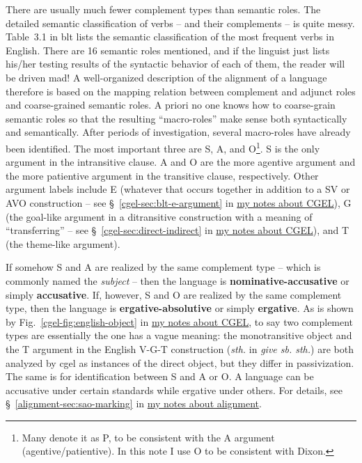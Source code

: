 \documentclass[UTF8, a4paper, oneside, scheme=plain]{ctexart}
\newcommand*{\citesec}[1]{\S~{#1}}
\newcommand*{\citefig}[1]{Fig.~{#1}}
\newcommand*{\citetable}[1]{Table~{#1}}
\newcommand*{\concept}[1]{\textbf{#1}}
\newcommand*{\term}[1]{\emph{#1}}
\newcommand*{\corpus}[1]{\emph{#1}}
\newcommand{\cgel}{\href{../English/cambridge.pdf}{my notes about CGEL}}
\newcommand{\alignment}{\href{../alignment/alignment.pdf}{my notes about alignment}}
\begin{document}
There are usually much fewer complement types than semantic roles.
The detailed semantic classification of verbs -- and their complements -- is quite messy. 
\citetable{3.1} in \ac{blt} lists the semantic classification of the most frequent verbs in English.
There are 16 semantic roles mentioned, 
and if the linguist just lists his/her testing results of the syntactic behavior of each of them,
the reader will be driven mad!
A well-organized description of the alignment of a language therefore is based on 
the mapping relation between complement and adjunct roles and coarse-grained semantic roles.
A priori no one knows how to coarse-grain semantic roles 
so that the resulting ``macro-roles'' make sense both syntactically and semantically.
After periods of investigation, several macro-roles have already been identified.
The most important three are S, A, and O\footnote{
    Many denote it as P, to be consistent with the A argument (agentive/patientive). 
    In this note I use O to be consistent with Dixon.
}.
S is the only argument in the intransitive clause.
A and O are the more agentive argument and the more patientive argument in the transitive clause, 
respectively.
Other argument labels include E 
(whatever that occurs together in addition to a SV or AVO construction
-- see \citesec{\ref{cgel-sec:blt-e-argument}} in \cgel),
G (the goal-like argument in a ditransitive construction with a meaning of ``transferring''
-- see \citesec{\ref{cgel-sec:direct-indirect}} in \cgel),
and T (the theme-like argument).

If somehow S and A are realized by the same complement type 
-- which is commonly named the \term{subject} --
then the language is \concept{nominative-accusative} or simply \concept{accusative}.
If, however, S and O are realized by the same complement type,
then the language is \concept{ergative-absolutive} or simply \concept{ergative}.
As is shown by \citefig{\ref{cgel-fig:english-object}} in \cgel,
to say two complement types are essentially the one 
has a vague meaning:
the monotransitive object and the T argument in the English V-G-T construction 
(\term{sth.} in \corpus{give sb. sth.})
are both analyzed by \ac{cgel} as instances of the direct object,
but they differ in passivization.
The same is for identification between S and A or O.
A language can be accusative under certain standards while ergative under others.
For details, see \citesec{\ref{alignment-sec:sao-marking}} in \alignment.
\end{document}
